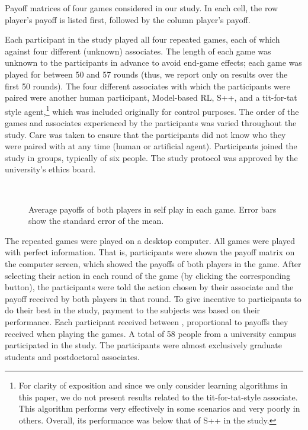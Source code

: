 \documentclass[fleqn,10pt]{SelfArx}
\begin{document}
\begin{table}[t]
	\caption{Payoff matrices of four games considered in our study.  In each cell, the row player's payoff is listed first, followed by the column player's payoff.}
	\label{fig:gameMatrix}
\end{table}

Each participant in the study played all four repeated games, each of which against four different (unknown) associates.  The length of each game was unknown to the participants in advance to avoid end-game effects; each game was played for between 50 and 57 rounds (thus, we report only on results over the first 50 rounds).  The four different associates with which the participants were paired were another human participant, Model-based RL, S++, and a tit-for-tat style agent,\footnote{For clarity of exposition and since we only consider learning algorithms in this paper, we do not present results related to the tit-for-tat-style associate.  This algorithm performs very effectively in some scenarios and very poorly in others.  Overall, its performance was below that of S++ in the study.} which was included originally for control purposes.  The order of the games and associates experienced by the participants was varied throughout the study. Care was taken to ensure that the participants did not know who they were paired with at any time (human or artificial agent).  Participants joined the study in groups, typically of six people. The study protocol was approved by the university's ethics board.

\begin{figure*}
\centering
	 ~~~~~~
	\\
	\caption{Average payoffs of both players in self play in each game.  Error bars show the standard error of the mean.}
\label{fig:selfplay1}
\end{figure*}

The repeated games were played on a desktop computer.  All games were played with perfect information.  That is, participants were shown the payoff matrix on the computer screen, which showed the payoffs of both players in the game.  After selecting their action in each round of the game (by clicking the corresponding button), the participants were told the action chosen by their associate and the payoff received by both players in that round.  To give incentive to participants to do their best in the study, payment to the subjects was based on their performance.  Each participant received between , proportional to payoffs they received when playing the games. A total of 58 people from a university campus participated in the study.  The participants were almost exclusively graduate students and postdoctoral associates.
\end{document}
